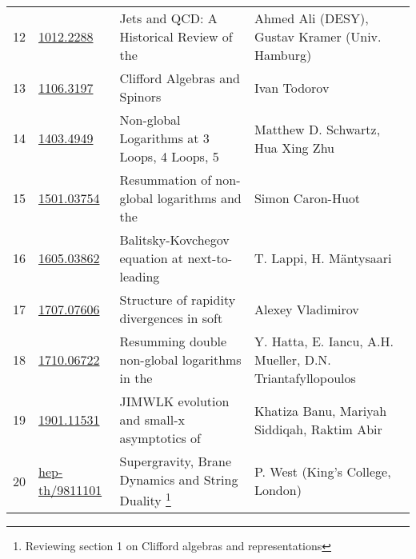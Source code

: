 \documentclass[landscape]{article}
\begin{document}
\begin{table}
{\begin{tabular}{|l|l|l|l|}
12 &  \href{https://arxiv.org/abs/1012.2288v2}{1012.2288} &  Jets and QCD: A Historical Review of the &  Ahmed Ali (DESY), Gustav Kramer (Univ. Hamburg) \\
13 &  \href{https://arxiv.org/abs/1106.3197v2}{1106.3197} &  Clifford Algebras and Spinors &  Ivan Todorov \\
14 &  \href{https://arxiv.org/abs/1403.4949v2}{1403.4949} &  Non-global Logarithms at 3 Loops, 4 Loops, 5 &  Matthew D. Schwartz, Hua Xing Zhu \\
15 &  \href{https://arxiv.org/abs/1501.03754v2}{1501.03754} &  Resummation of non-global logarithms and the &  Simon Caron-Huot \\
16 &  \href{https://arxiv.org/abs/1605.03862v1}{1605.03862} &  Balitsky-Kovchegov equation at next-to-leading &  T. Lappi, H. Mäntysaari \\
17 &  \href{https://arxiv.org/abs/1707.07606v2}{1707.07606} &  Structure of rapidity divergences in soft &  Alexey Vladimirov \\
18 &  \href{https://arxiv.org/abs/1710.06722v1}{1710.06722} &  Resumming double non-global logarithms in the &  Y. Hatta, E. Iancu, A.H. Mueller, D.N. Triantafyllopoulos \\
19 &  \href{https://arxiv.org/abs/1901.11531v2}{1901.11531} &  JIMWLK evolution and small-x asymptotics of &  Khatiza Banu, Mariyah Siddiqah, Raktim Abir \\
20 &  \href{https://arxiv.org/abs/hep-th/9811101v1}{hep-th/9811101} &  Supergravity, Brane Dynamics and String Duality \footnote{Reviewing section 1 on Clifford algebras and representations} &  P. West (King's College, London) \\
\hline
\end{tabular}}
\end{table}
\end{document}
